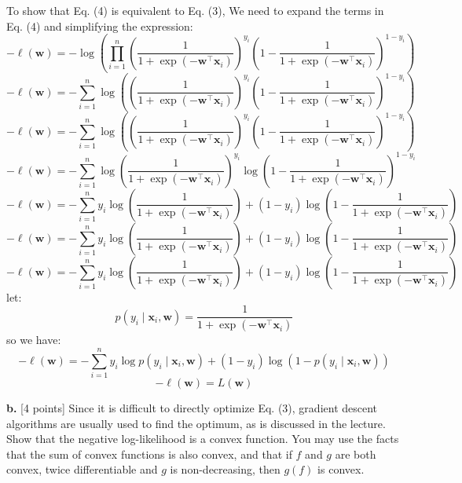 \documentclass[a3paper,12pt]{extarticle} %
\begin{document}
To show that Eq. (4) is equivalent to Eq. (3), We need to expand the terms in Eq. (4) and simplifying the expression:
\[
-\ell(\mathbf{w}) = -\log \left( \prod_{i=1}^n \left( \frac{1}{1 + \exp(-\mathbf{w}^\top \mathbf{x}_i)} \right)^{y_i} \left( 1 - \frac{1}{1 + \exp(-\mathbf{w}^\top \mathbf{x}_i)} \right)^{1 - y_i} \right)
\]
\[
-\ell(\mathbf{w}) = -\sum_{i=1}^n \log \left( \left( \frac{1}{1 + \exp(-\mathbf{w}^\top \mathbf{x}_i)} \right)^{y_i} \left( 1 - \frac{1}{1 + \exp(-\mathbf{w}^\top \mathbf{x}_i)} \right)^{1 - y_i} \right)
\]
\[
-\ell(\mathbf{w}) = -\sum_{i=1}^n \log \left( \left( \frac{1}{1 + \exp(-\mathbf{w}^\top \mathbf{x}_i)} \right)^{y_i} \left( 1 - \frac{1}{1 + \exp(-\mathbf{w}^\top \mathbf{x}_i)} \right)^{1 - y_i} \right)
\]
\[
-\ell(\mathbf{w}) = -\sum_{i=1}^n \log \left( \frac{1}{1 + \exp(-\mathbf{w}^\top \mathbf{x}_i)} \right)^{y_i} \log \left( 1 - \frac{1}{1 + \exp(-\mathbf{w}^\top \mathbf{x}_i)} \right)^{1 - y_i}
\]
\[
-\ell(\mathbf{w}) = -\sum_{i=1}^n y_i \log \left( \frac{1}{1 + \exp(-\mathbf{w}^\top \mathbf{x}_i)} \right) + (1 - y_i) \log \left( 1 - \frac{1}{1 + \exp(-\mathbf{w}^\top \mathbf{x}_i)}\right)
\]
\[
-\ell(\mathbf{w}) = -\sum_{i=1}^n y_i \log \left( \frac{1}{1 + \exp(-\mathbf{w}^\top \mathbf{x}_i)} \right) + (1 - y_i) \log \left( 1 - \frac{1}{1 + \exp(-\mathbf{w}^\top \mathbf{x}_i)} \right)
\]
\[
-\ell(\mathbf{w}) = -\sum_{i=1}^n y_i \log \left( \frac{1}{1 + \exp(-\mathbf{w}^\top \mathbf{x}_i)} \right) + (1 - y_i) \log \left( 1 - \frac{1}{1 + \exp(-\mathbf{w}^\top \mathbf{x}_i)} \right)
\]
let:
\[
p(y_i \mid \mathbf{x}_i, \mathbf{w}) = \frac{1}{1 + \exp(-\mathbf{w}^\top \mathbf{x}_i)}
\]
so we have:
\[
-\ell(\mathbf{w}) = -\sum_{i=1}^n y_i \log p(y_i \mid \mathbf{x}_i, \mathbf{w}) + (1 - y_i) \log (1 - p(y_i \mid \mathbf{x}_i, \mathbf{w}))
\]
\[
-\ell(\mathbf{w}) = L(\mathbf{w})
\]

\textbf{b.} [4 points] Since it is difficult to directly optimize Eq. (3), gradient descent algorithms are usually used to find the optimum, as is discussed in the lecture. Show that the negative log-likelihood is a convex function. You may use the facts that the sum of convex functions is also convex, and that if $f$ and $g$ are both convex, twice differentiable and $g$ is non-decreasing, then $g(f)$ is convex.
\end{document}
